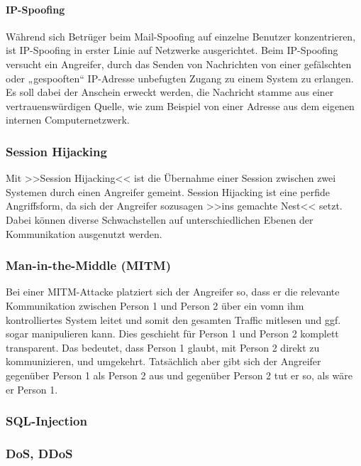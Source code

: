 \paragraph{IP-Spoofing} Während sich Betrüger beim Mail-Spoofing auf einzelne Benutzer konzentrieren, ist IP-Spoofing in erster Linie auf Netzwerke ausgerichtet.
Beim IP-Spoofing versucht ein Angreifer, durch das Senden von Nachrichten von einer gefälschten oder „gespooften“ IP-Adresse unbefugten Zugang zu einem System zu erlangen. Es soll dabei der Anschein erweckt werden, die Nachricht stamme aus einer vertrauenswürdigen Quelle, wie zum Beispiel von einer Adresse aus dem eigenen internen Computernetzwerk.

\subsubsection{Session Hijacking}
\label{sec:SessionHijacking}

Mit >>Session Hijacking<< ist die Übernahme einer Session zwischen zwei Systemen durch einen Angreifer gemeint. Session Hijacking ist eine perfide Angriffsform, da sich der Angreifer sozusagen >>ins gemachte Nest<< setzt. Dabei können diverse Schwachstellen auf unterschiedlichen Ebenen der Kommunikation ausgenutzt werden.


\subsubsection{Man-in-the-Middle (MITM)}
\label{sec:ManInTheMiddle}

Bei einer MITM-Attacke platziert sich der Angreifer so, dass er die relevante Kommunikation zwischen Person 1 und Person 2 über ein vomn ihm kontrolliertes System leitet und somit den gesamten Traffic mitlesen und ggf. sogar manipulieren kann. Dies geschieht für Person 1 und Person 2 komplett transparent. Das bedeutet, dass Person 1 glaubt, mit Person 2 direkt zu kommunizieren, und umgekehrt. Tatsächlich aber gibt sich der Angreifer gegenüber Person 1 als Person 2 aus und gegenüber Person 2 tut er so, als wäre er Person 1.


\subsubsection{SQL-Injection}

\subsubsection{DoS, DDoS}
\label{sec:DoSDDoS}

